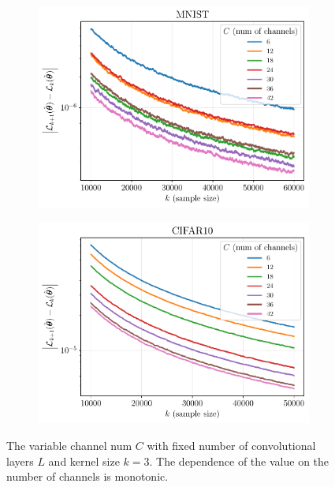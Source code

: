 \documentclass[conference]{IEEEtran}
\begin{document}
\begin{figure}[ht]
  \begin{subfigure}[b]{0.5\linewidth}
    \centering
    \includegraphics[width=\linewidth]{isp/figs/mnist_change_channels.pdf} 
  \end{subfigure}%
  \begin{subfigure}[b]{0.5\linewidth}
    \centering
    \includegraphics[width=\linewidth]{isp/figs/cifar10_change_channels.pdf} 
  \end{subfigure} 
  \caption{The variable channel num $C$ with fixed number of convolutional layers $L$ and kernel size $k=3$. The dependence of the value on the number of channels is monotonic.}
   \label{fig:channels}
\end{figure}
\end{document}
